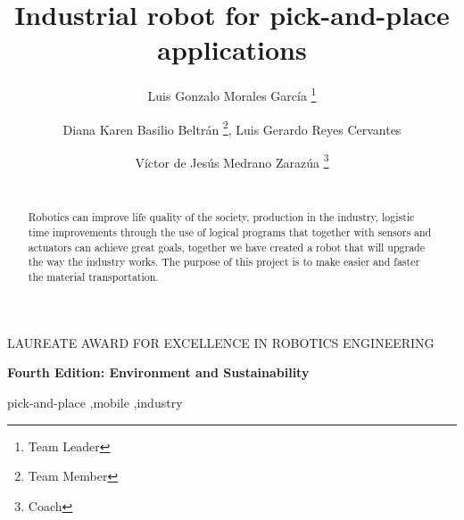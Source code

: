 \documentclass[preprint,12pt,3p]{elsarticle}
\begin{document}
\begin{frontmatter}

\begin{center}
    LAUREATE AWARD FOR EXCELLENCE IN ROBOTICS ENGINEERING
\end{center}

\begin{center}
    \textbf{Fourth Edition: Environment and Sustainability}
\end{center}

\hline

\bigskip
\bigskip

\title{Industrial robot for pick-and-place applications}%

\author{Luis Gonzalo Morales García \footnote{Team Leader}}%




\author{Diana Karen Basilio Beltrán \footnote{Team Member}, Luis Gerardo Reyes Cervantes \footnotemark[\value{footnote}]}


\author{Víctor de Jesús Medrano Zarazúa \footnote{Coach}\\\\}


\address{Universidad del Valle de México, Campus Monterrey}
\address{Monterrey, Nuevo León, México}%
\address{luisgonzalo96@gmail.com}

\begin{abstract}
    Robotics can improve life quality of the society, production in the industry, logistic time improvements through the use of logical programs that together with sensors and actuators can achieve great goals, together we have created a robot that will upgrade the way the industry works. The purpose of this project is to make easier and faster the material transportation.
\end{abstract}

\begin{keyword}
pick-and-place \sep mobile \sep industry
\end{keyword}

\end{frontmatter}
\end{document}
